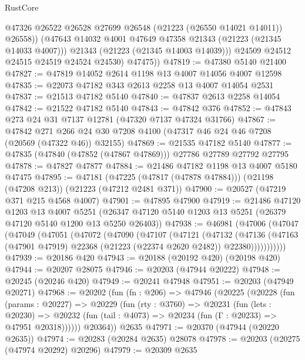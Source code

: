 \begin{lexlean}{RustCore}
\begin{coremodule}
                @47326
                @26522
                @26528
                @27699
                @26548
                (@21223 (@26550 @14021 @14011))
                @26558))
            (@47643 @14032 @4001 @47649 @47358 @21343 (@21223 (@21345 @14033 @4007)))
            @21343
            (@21223 (@21345 @14003 @14039)))
          @24509
          @24512
          @24515
          @24519
          @24524
          @24530)
        @47475))
@47819 := @47380 @5140 @21400
@47827 := @47819 @14052 @2614 @1198 @13 @4007 @14056 @4007 @12598
@47835 := @22073 @47182 @343 @2613 @2258 @13 @4007 @14054 @2531
@47837 := @21513 @47182 @5140
@47840 := @47837 @2613 @2258 @14054
@47842 := @21522 @47182 @5140
@47843 := @47842 @376
@47852 := @47843 @273 @24 @31 @7137 @12781 (@47320 @7137 @47324 @31766)
@47867 := @47842
    @271
    @266
    @24
    @30
    @7208
    @4100
    (@47317 @46 @24 @46 @7208 (@20569 (@47322 @46)) @32155)
@47869 := @21535 @47182 @5140
@47877 := @47835 (@47840 (@47852 (@47867 @47869))) @27786 @27789 @27792 @27795
@47878 := @47827 @47877
@47884 := @21486 @47182 @1198 @13 @4007 @5180 @47475
@47895 := @47181
    (@47225 (@47817 (@47878 @47884)))
    (@21198 (@47208 @213))
    (@21223 (@47212 @2481 @371))
@47900 := @20527 (@47219 @371 @215 @4568 @4007)
@47901 := @47895 @47900
@47919 := @21486
    @47120
    @1203
    @13
    @4007
    @5251
    (@26347 @47120 @5140 @1203 @13 @5251 (@26379 @47120 @5140 @1200 @13 @5250 @26403))
@47938 := @46981
    (@47006
      (@47047
        (@47049
          (@47051
            (@47072
              (@47090
                (@47107
                  (@47121
                    (@47132
                      (@47136
                        (@47163
                          (@47901 @47919)
                          @22368
                          (@21223 (@22374 @2620 @2482))
                          @22380)))))))))))
@47939 := @20186 @420
@47943 := @20188 (@20192 @420) (@20198 @420)
@47944 := @20207 @28075
@47946 := @20203 (@47944 @20222)
@47948 := @20245 (@20246 @420)
@47949 := @20241 @47948
@47951 := @20203 (@47949 @20271)
@47968 := @20202
    (fun (fn : @206) =>
    @47946
      (@20225
        (@20228
          (fun (params : @20227) =>
          @20229
            (fun (rty : @3760) =>
            @20231
              (fun (lets : @20230) =>
              @20232 (fun (tail : @4073) => @20234 (fun (Γ : @20233) => @47951 @20318))))))
        @20364))
    @2635
@47971 := @20370 (@47944 (@20220 @2635))
@47974 := @20283 (@20284 @2635) @28078
@47978 := @20203 (@20275 (@47974 @20292) @20296)
@47979 := @20309 @2635

\end{coremodule}
\end{lexlean}
